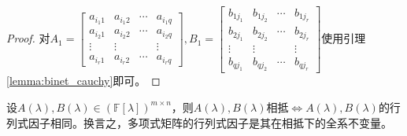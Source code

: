         \begin{proof}
            对$A_1=\begin{bmatrix}a_{i_1 1}&a_{i_1 2}&\cdots&a_{i_1 q}\\a_{i_2 1}&a_{i_2 2}&\cdots&a_{i_2 q}\\\vdots&\vdots&&\vdots\\a_{i_r 1}&a_{i_r 2}&\cdots&a_{i_r q}\end{bmatrix},B_1=\begin{bmatrix}b_{1j_1}&b_{1j_2}&\cdots&b_{1j_r}\\b_{2j_1}&b_{2j_2}&\cdots&b_{2j_r}\\\vdots&\vdots&&\vdots\\b_{qj_1}&b_{qj_2}&\cdots&b_{qj_r}\end{bmatrix}$使用引理\ref{lemma:binet_cauchy}即可。
        \end{proof}

        \begin{theorem}
            \label{thm:poly_matrix_invariant}
            设$A(\lambda),B(\lambda)\in(\mathbb{F}[\lambda])^{m\times n}$，则$A(\lambda),B(\lambda)$相抵$\Leftrightarrow A(\lambda),B(\lambda)$的行列式因子相同。换言之，多项式矩阵的行列式因子是其在相抵下的全系不变量。
        \end{theorem}

